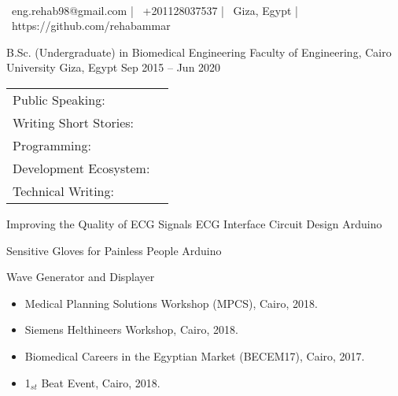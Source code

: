 \documentclass[]{awesome-cv}
\begin{document}
    
\begin{center}
	  \\
	\vspace{2mm}
	{\faEnvelope\ eng.rehab98@gmail.com} | {\faMobile\ +201128037537} | {\faMapMarker\ Giza, Egypt} | {\faLink\ https://github.com/rehabammar}
\end{center}
\begin{cventries}
	\cventry
	{B.Sc. (Undergraduate) in Biomedical Engineering}
	{Faculty of Engineering, Cairo University}
	{Giza, Egypt}
	{Sep 2015 – Jun 2020}
	{}
\end{cventries}

\vspace{-2mm}

\begin{cventries}
	\cventry
	{}
	{\def\arraystretch{1.15}{\begin{tabular}{ l l }
		Public Speaking:  & {\skill{ }} \\
		Writing Short Stories:  & {\skill{ Arabic Literature}} \\
		Programming:  & {\skill{ Modern C++ (2011) - Beginner Level}} \\
		Development Ecosystem:  & {\skill{ Git, CMake (Build System)}} \\
		Technical Writing:  & {\skill{ Latex, Markdown, MS Word}} \\
		\end{tabular}}}
	{}
	{}
	{}
\end{cventries}

\vspace{-7mm}
\begin{cventries}
	\cventry
	{Improving the Quality of ECG Signals}
	{ECG Interface Circuit Design}
	{Arduino}
	{}
	{}
	
	\vspace{-5mm}
	\cventry
	{}
	{Sensitive Gloves for Painless People}
	{Arduino}
	{}
	{}
	
	\vspace{-5mm}
	\cventry
	{}
	{Wave Generator and Displayer}
	{}
	{}
	{}
	
	\vspace{-5mm}
\end{cventries}

\begin{itemize}
	\item Medical Planning Solutions Workshop (MPCS), Cairo, 2018.
	\item Siemens Helthineers Workshop, Cairo, 2018.
	\item Biomedical Careers in the Egyptian Market (BECEM17), Cairo, 2017.
	\item 1$_{st}$ Beat Event, Cairo, 2018.
\end{itemize}

\ 
\end{document}
